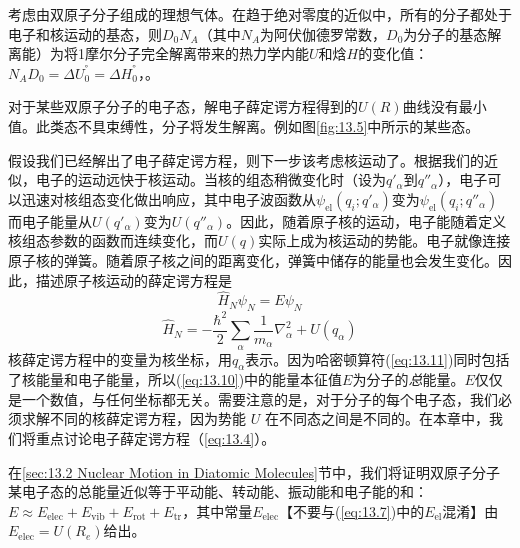     考虑由双原子分子组成的理想气体。在趋于绝对零度的近似中，所有的分子都处于电子和核运动的基态，则$D_0N_A$（其中$N_A$为阿伏伽德罗常数，$D_0$为分子的基态解离能）为将1摩尔分子完全解离带来的热力学内能$U$和焓$H$的变化值：$N_AD_0 = \Delta U^°_0 = \Delta H^°_0$，。

    对于某些双原子分子的电子态，解电子薛定谔方程得到的$U\left(R\right)$曲线没有最小值。此类态不具束缚性，分子将发生解离。例如图\ref{fig:13.5}中所示的某些态。

    假设我们已经解出了电子薛定谔方程，则下一步该考虑核运动了。根据我们的近似，电子的运动远快于核运动。当核的组态稍微变化时（设为$q'_{\alpha}$到$q''_{\alpha}$），电子可以迅速对核组态变化做出响应，其中电子波函数从$\psi_{\text{el}}\left(q_i;q'_{\alpha}\right)$变为$\psi_{\text{el}}\left(q_i;q''_{\alpha}\right)$而电子能量从$U\left(q'_{\alpha}\right)$变为$U\left(q''_{\alpha}\right)$。因此，随着原子核的运动，电子能随着定义核组态参数的函数而连续变化，而$U\left(q\right)$实际上成为核运动的势能。电子就像连接原子核的弹簧。随着原子核之间的距离变化，弹簧中储存的能量也会发生变化。因此，描述原子核运动的薛定谔方程是
    \begin{equation}
        \boxed{
            \hat{H}_N\psi_N = E\psi_N
        }
        \label{eq:13.10}
    \end{equation}
    \begin{equation}
        \hat{H}_{N} = -\frac{\hbar^{2}}{2}\sum_{\alpha}\frac{1}{m_{\alpha}}\nabla_{\alpha}^{2} + U\left(q_{\alpha}\right)
        \label{eq:13.11}
    \end{equation}
    核薛定谔方程中的变量为核坐标，用$q_{\alpha}$表示。因为哈密顿算符(\ref{eq:13.11})同时包括了核能量和电子能量，所以(\ref{eq:13.10})中的能量本征值$E$为分子的\textit{总}能量。$E$仅仅是一个数值，与任何坐标都无关。需要注意的是，对于分子的每个电子态，我们必须求解不同的核薛定谔方程，因为势能 $U$ 在不同态之间是不同的。在本章中，我们将重点讨论电子薛定谔方程（\ref{eq:13.4}）。

    在\ref{sec:13.2 Nuclear Motion in Diatomic Molecules}节中，我们将证明双原子分子某电子态的总能量近似等于平动能、转动能、振动能和电子能的和：$E \approx E_{\text{elec}} + E_{\text{vib}} + E_{\text{rot}} + E_{\text{tr}}$，其中常量$E_{\text{elec}}$【不要与(\ref{eq:13.7})中的$E_{\text{el}}$混淆】由$E_{\text{elec}} = U\left(R_e\right)$给出。

